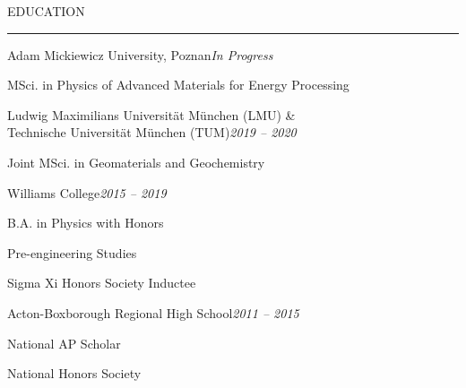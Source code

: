 \documentclass{resume} %
\renewenvironment{rSection}[1]{
	\sectionskip
	\textcolor{RoyalPurple}{\MakeUppercase{#1}}
	\sectionlineskip
	\hrule
	\begin{list}{}{
			\setlength{\leftmargin}{1.5em}
		}
		\item[]
	}{
	\end{list}
}
\begin{document}


\vspace{-2em}
	\begin{rSection}{Education} 
		\begin{rSubsection}{Adam Mickiewicz University, Poznan}{\em In Progress}{}{}
			\vspace{-.5em}
			\item MSci. in Physics of Advanced Materials for Energy Processing
		\end{rSubsection}
		
		\begin{rSubsection}{Ludwig Maximilians Universit{\"a}t  M{\"u}nchen (LMU) \&\\Technische Universit{\"a}t M{\"u}nchen (TUM)}{\em 2019 -- 2020}{}{}
			\vspace{-.5em}
			\item Joint MSci. in Geomaterials and Geochemistry
		\end{rSubsection}


		\begin{rSubsection}{Williams College}{\em 2015 -- 2019}{}{}
			\vspace{-.5em}
			\item B.A. in Physics with Honors
			\item Pre-engineering Studies
			\item Sigma Xi Honors Society Inductee
		\end{rSubsection}

		\begin{rSubsection}{Acton-Boxborough Regional High School}{\em 2011 -- 2015}{}{}
			\vspace{-.5em}
			\item National AP Scholar
			\item National Honors Society
		\end{rSubsection}



	\end{rSection}
	\newcommand{\CC}{C\nolinebreak\hspace{-.05em}\raisebox{.4ex}{\tiny\bf +}\nolinebreak\hspace{-.10em}\raisebox{.4ex}{\tiny\bf +}}
	\def\CC{{C\nolinebreak[4]\hspace{-.05em}\raisebox{.4ex}{\tiny\bf ++}}}
\end{document}
